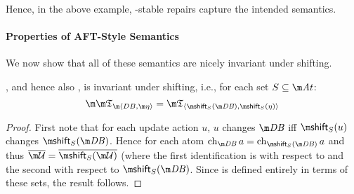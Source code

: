 Hence, in the above example, \Ap-stable repairs capture the intended semantics.

\paragraph{Properties of AFT-Style Semantics}%
% 

We now show that all of these semantics are nicely invariant under shifting. 
\begin{proposition}
 \Ap, and hence also \Op, is invariant under shifting, i.e., for each set $S\subseteq \atoms$:
 \[\Apfull = \threeap_{\langle\shift_S(\db),\shift_S(\eta)\rangle}\]
\end{proposition}
\begin{proof}
First note that for each update action $u$, $u$ changes $\db$ iff $\shift_S(u)$ changes $\shift_S(\db)$. Hence for each atom $\change_{\db} a = \change_{\shift_S(\db)} a$ and thus
$\overline{\UU}=\overline{\shift_S(\UU)}$ 
(where the first identification is with respect to \db and the second with respect to $\shift_S(\db)$. 
Since \Ap is defined entirely in terms of these sets, the result follows. 
\end{proof}


